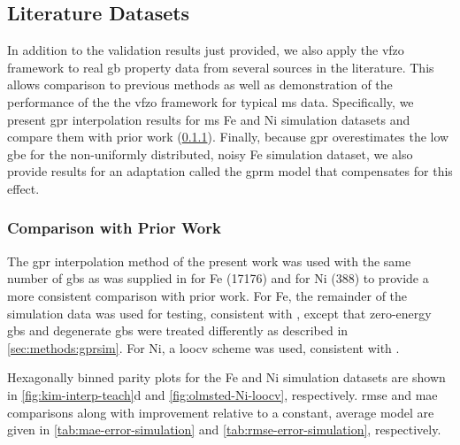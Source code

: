 \documentclass[final,twocolumn,12pt]{elsarticle}
\begin{document}
\subsection{Literature Datasets}
\label{sec:results:simulation}

In addition to the validation results just provided, we also apply the \gls{vfzo} framework to real \gls{gb} property data from several sources in the literature. This allows comparison to previous methods as well as demonstration of the performance of the the \gls{vfzo} framework for typical \gls{ms} data. Specifically, we present \gls{gpr} interpolation results for \gls{ms} Fe and Ni simulation datasets and compare them with prior work (\cref{sec:results:simulation:compare}). Finally, because \gls{gpr} overestimates the low \gls{gbe} for the non-uniformly distributed, noisy Fe simulation dataset, we also provide results for an adaptation called the \gls{gprm} model that compensates for this effect.

\subsubsection{Comparison with Prior Work}
\label{sec:results:simulation:compare}

The \gls{gpr} interpolation method of the present work was used with the same number of \inpt{} \glspl{gb} as was supplied in \citet{restrepoUsingArtificialNeural2014} for Fe (\num{17176}) and \citet{chesserLearningGrainBoundary2020} for Ni (\num{388}) to provide a more consistent comparison with prior work. For Fe, the remainder of the simulation data was used for testing, consistent with \citet{restrepoUsingArtificialNeural2014}, except that zero-energy \glspl{gb} and degenerate \glspl{gb} were treated differently as described in \cref{sec:methods:gprsim}. For Ni, a \gls{loocv} scheme was used, consistent with \citet{chesserLearningGrainBoundary2020}. 

Hexagonally binned parity plots for the Fe and Ni simulation datasets are shown in \cref{fig:kim-interp-teach}d and \cref{fig:olmsted-Ni-loocv}, respectively. \Gls{rmse} and \gls{mae} comparisons along with improvement relative to a constant, average model are given in \cref{tab:mae-error-simulation} and \cref{tab:rmse-error-simulation}, respectively.
\end{document}
